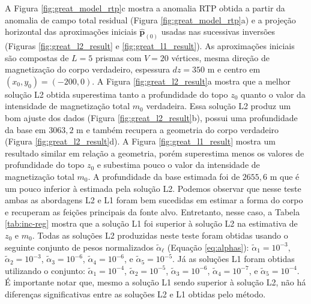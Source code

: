 A Figura \ref{fig:great_model_rtp}c mostra a anomalia RTP obtida a partir da anomalia de campo total residual (Figura \ref{fig:great_model_rtp}a) e 
a projeção horizontal das aproximações iniciais $\hat{\mathbf{p}}_{(0)}$ 
usadas nas sucessivas inversões (Figuras \ref{fig:great_l2_result} e 
\ref{fig:great_l1_result}).
As aproximações iniciais são compostas de $ L= 5$ prismas com $ V = 20 $ vértices, mesma direção de magnetização do corpo verdadeiro, espessura $ dz=350 $ m e centro em $ (x_0, y_0) = (-200, 0) $.
A Figura \ref{fig:great_l2_result}a mostra que a melhor solução L2 obtida superestima tanto a profundidade do topo $z_{0}$ quanto o valor da intensidade de magnetização total $m_{0}$ verdadeira. Essa solução L2 produz um bom ajuste dos dados (Figura \ref{fig:great_l2_result}b), possui uma profundidade da base em $3063,2$ m e também recupera a geometria do corpo verdadeiro (Figura \ref{fig:great_l2_result}d).
A Figura \ref{fig:great_l1_result} mostra um resultado similar em relação a geometria, porém superestima menos os valores de profundidade do topo $z_{0}$ e subestima pouco o valor da intensidade de magnetização total $m_{0}$. A profundidade da base estimada foi de $2655,6$ m que é um pouco inferior à estimada pela solução L2.
Podemos observar que nesse teste ambas as abordagens L2 e L1 foram bem sucedidas em estimar a forma do corpo e recuperam as feições principais da fonte alvo. Entretanto, nesse caso, a Tabela \ref{tab:inc-reg} mostra que a solução L1 foi superior à solução L2 na estimativa de $ z_0 $ e $ m_0 $.
Todas as soluções L2 produzidas neste teste foram obtidas usando o seguinte conjunto de pesos normalizados $\tilde{\alpha}_{\ell}$ (Equação \ref{eq:alphas}): 
$\tilde{\alpha}_{1} = 10^{-3}$, $\tilde{\alpha}_{2} = 10^{-3}$, 
$\tilde{\alpha}_{3} = 10^{-6}$, $\tilde{\alpha}_{4} = 10^{-6}$, e 
$\tilde{\alpha}_{5} = 10^{-5}$. 
Já as soluções L1 foram obtidas utilizando o conjunto: 
$\tilde{\alpha}_{1} = 10^{-4}$, $\tilde{\alpha}_{2} = 10^{-5}$, 
$\tilde{\alpha}_{3} = 10^{-6}$, $\tilde{\alpha}_{4} = 10^{-7}$, e 
$\tilde{\alpha}_{5} = 10^{-4}$.
É importante notar que, mesmo a solução L1 sendo superior à solução L2, não há diferenças significativas entre as soluções L2 e L1 obtidas pelo método.

